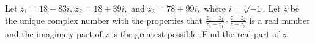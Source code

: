 Let $z_1 = 18 + 83i$, $z_2 = 18 + 39i, $ and $z_3 = 78 + 99i,$ where $i = \sqrt{-1}$. Let $z$ be the unique complex number with the properties that $\frac{z_3 - z_1}{z_2 - z_1} \cdot \frac{z - z_2}{z - z_3}$ is a real number and the imaginary part of $z$ is the greatest possible. Find the real part of $z$.